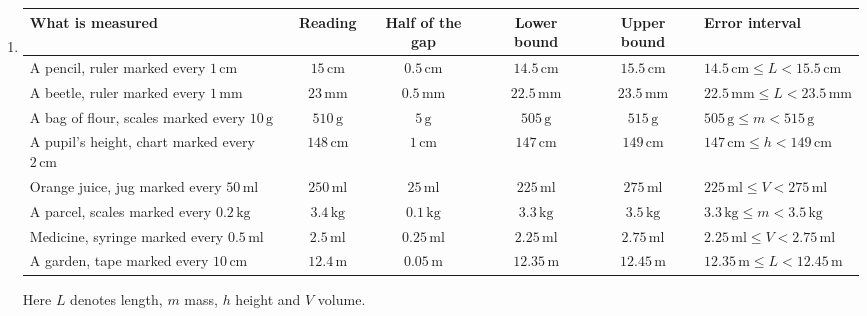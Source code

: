 \documentclass[11pt,a4paper]{article}
\begin{document}
\begin{enumerate}[label=\textbf{Q\arabic*.}, start=9, leftmargin=*, itemsep=8pt]
\item 
\begin{solbox}
\renewcommand{\arraystretch}{1.35}
\begin{center}
\footnotesize
\setlength{\tabcolsep}{3pt}
\begin{tabular}{|>{\raggedright\arraybackslash}p{3.6cm}|c|c|c|c|>{\raggedright\arraybackslash}p{4.6cm}|}
\hline
\textbf{What is measured} & \textbf{Reading} & \textbf{Half of the gap} & \textbf{Lower bound} & \textbf{Upper bound} & \textbf{Error interval}\\
\hline
A pencil, ruler marked every \(1\,\text{cm}\) & \(15\,\text{cm}\) & \(0.5\,\text{cm}\) & \(14.5\,\text{cm}\) & \(15.5\,\text{cm}\) & \(14.5\,\text{cm}\le L<15.5\,\text{cm}\)\\
\hline
A beetle, ruler marked every \(1\,\text{mm}\) & \(23\,\text{mm}\) & \(0.5\,\text{mm}\) & \(22.5\,\text{mm}\) & \(23.5\,\text{mm}\) & \(22.5\,\text{mm}\le L<23.5\,\text{mm}\)\\
\hline
A bag of flour, scales marked every \(10\,\text{g}\) & \(510\,\text{g}\) & \(5\,\text{g}\) & \(505\,\text{g}\) & \(515\,\text{g}\) & \(505\,\text{g}\le m<515\,\text{g}\)\\
\hline
A pupil's height, chart marked every \(2\,\text{cm}\) & \(148\,\text{cm}\) & \(1\,\text{cm}\) & \(147\,\text{cm}\) & \(149\,\text{cm}\) & \(147\,\text{cm}\le h<149\,\text{cm}\)\\
\hline
Orange juice, jug marked every \(50\,\text{ml}\) & \(250\,\text{ml}\) & \(25\,\text{ml}\) & \(225\,\text{ml}\) & \(275\,\text{ml}\) & \(225\,\text{ml}\le V<275\,\text{ml}\)\\
\hline
A parcel, scales marked every \(0.2\,\text{kg}\) & \(3.4\,\text{kg}\) & \(0.1\,\text{kg}\) & \(3.3\,\text{kg}\) & \(3.5\,\text{kg}\) & \(3.3\,\text{kg}\le m<3.5\,\text{kg}\)\\
\hline
Medicine, syringe marked every \(0.5\,\text{ml}\) & \(2.5\,\text{ml}\) & \(0.25\,\text{ml}\) & \(2.25\,\text{ml}\) & \(2.75\,\text{ml}\) & \(2.25\,\text{ml}\le V<2.75\,\text{ml}\)\\
\hline
A garden, tape marked every \(10\,\text{cm}\) & \(12.4\,\text{m}\) & \(0.05\,\text{m}\) & \(12.35\,\text{m}\) & \(12.45\,\text{m}\) & \(12.35\,\text{m}\le L<12.45\,\text{m}\)\\
\hline
\end{tabular}
\end{center}
Here \(L\) denotes length, \(m\) mass, \(h\) height and \(V\) volume.
\end{solbox}

\end{enumerate}
\end{document}
